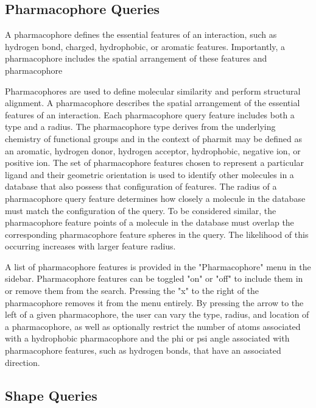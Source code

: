 \subsection{Pharmacophore Queries}
A pharmacophore \cite{Koes_2015rev,Yang_2010,Leach_2010} defines the essential features of an interaction, such as hydrogen bond, charged, hydrophobic, or aromatic features. Importantly, a pharmacophore includes the spatial arrangement of these features and pharmacophore


Pharmacophores are used to define molecular similarity and perform structural alignment. A pharmacophore describes the spatial arrangement of the essential features of an interaction. Each pharmacophore query feature includes both a type and a radius. The pharmacophore type derives from the underlying chemistry of functional groups and in the context of pharmit may be defined as an aromatic, hydrogen donor, hydrogen acceptor, hydrophobic, negative ion, or positive ion. The set of pharmacophore features chosen to represent a particular ligand and their geometric orientation is used to identify other molecules in a database that also possess that configuration of features. The radius of a pharmacophore query feature determines how closely a molecule in the database must match the configuration of the query. To be considered similar, the pharmacophore feature points of a molecule in the database must overlap the corresponding pharmacophore feature spheres in the query. The likelihood of this occurring increases with larger feature radius.

A list of pharmacophore features is provided in the "Pharmacophore" menu in the sidebar. Pharmacophore features can be toggled "on" or "off" to include them in or remove them from the search. Pressing the "x" to the right of the pharmacophore removes it from the menu entirely. By pressing the arrow to the left of a given pharmacophore, the user can vary the type, radius, and location of a pharmacophore, as well as optionally restrict the number of atoms associated with a hydrophobic pharmacophore and the phi or psi angle associated with pharmacophore features, such as hydrogen bonds, that have an associated direction.


\subsection{Shape Queries}

